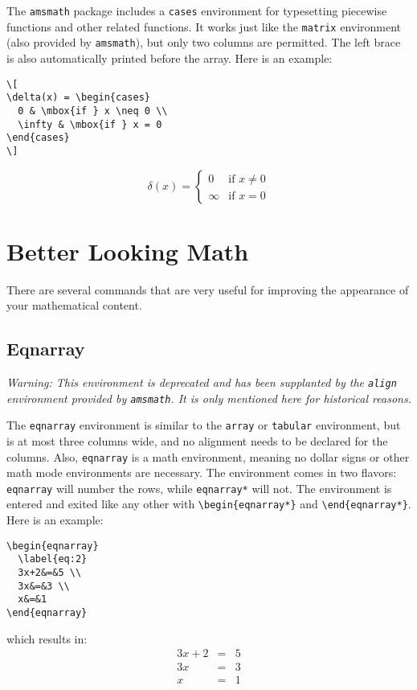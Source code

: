 The \verb_amsmath_ package includes a \verb_cases_
environment for typesetting piecewise functions and other related
functions. It works just like the \verb_matrix_ environment (also
provided by \verb_amsmath_), but only two columns are permitted.
The left brace is also automatically printed before the array.
Here is an example:
\begin{verbatim}
\[
\delta(x) = \begin{cases}
  0 & \mbox{if } x \neq 0 \\
  \infty & \mbox{if } x = 0
\end{cases}
\]
\end{verbatim}
\[
\delta(x) = \begin{cases}
  0 & \mbox{if } x \neq 0 \\
  \infty & \mbox{if } x = 0
\end{cases}
\]

\section{Better Looking Math}
\label{sec:better-looking-math}

There are several commands that are very useful for improving the
appearance of your mathematical content.

\subsection{Eqnarray}
\label{sec:eqnarray}

\emph{Warning: This environment is deprecated and has
  been supplanted by the \texttt{align} environment provided by
  \texttt{amsmath}. It is only mentioned here for historical reasons.}

The \texttt{eqnarray} environment is similar to the \texttt{array} or
\texttt{tabular} environment, but is at most three columns wide, and
no alignment needs to be declared for the columns.  Also,
\texttt{eqnarray} is a math environment, meaning no dollar signs or
other math mode environments are necessary.  The environment comes in
two flavors: \texttt{eqnarray} will number the rows, while
\texttt{eqnarray*} will not.  The environment is entered and exited
like any other with \verb|\begin{eqnarray*}| and
\verb|\end{eqnarray*}|.  Here is an example:
\begin{verbatim}
\begin{eqnarray}
  \label{eq:2}
  3x+2&=&5 \\
  3x&=&3 \\
  x&=&1
\end{eqnarray}
\end{verbatim}
which results in:
\begin{eqnarray}
  \label{eq:2}
  3x+2&=&5 \\
  3x&=&3 \\
  x&=&1
\end{eqnarray}

